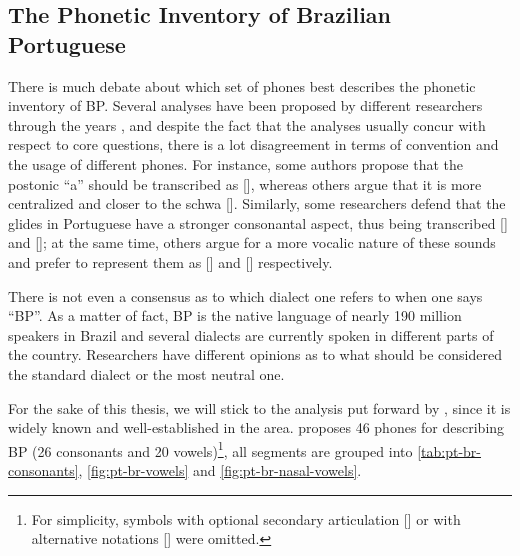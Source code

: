 \subsection{The Phonetic Inventory of Brazilian Portuguese} 

There is much debate about which set of phones best describes the phonetic inventory of \gls{BP}. Several analyses have been proposed by different researchers through the years \cite{Bisol2005, Cagliari2002, Camara1970, Cristofaro2005, Neves1999}, and despite the fact that the analyses usually concur with respect to core questions, there is a lot disagreement in terms of convention and the usage of different phones.  For instance, some authors propose that the postonic ``a'' should be transcribed as [], whereas others argue that it is more centralized and closer to the schwa []. Similarly, some researchers defend that the glides in Portuguese have a stronger consonantal aspect, thus being transcribed [] and []; at the same time, others argue for a more vocalic nature of these sounds and prefer to represent them as [] and [] respectively. 

There is not even a consensus as to which dialect one refers to when one says ``\gls{BP}''. As a matter of fact, \gls{BP} is the native language of nearly 190 million speakers in Brazil \cite{Ethnologue2005} and several dialects are currently spoken in different parts of the country. Researchers have different opinions as to what should be considered the standard dialect or the most neutral one.

For the sake of this thesis, we will stick to the analysis put forward by \citet{Cristofaro2005}, since it is widely known and well-established in the area. \citet{Cristofaro2005} proposes 46 phones for describing \gls{BP} (26 consonants and 20 vowels)\footnote{For simplicity, symbols with optional secondary articulation [] or with alternative notations [] were omitted.}, all segments are grouped into \autoref{tab:pt-br-consonants}, \autoref{fig:pt-br-vowels} and \autoref{fig:pt-br-nasal-vowels}.

